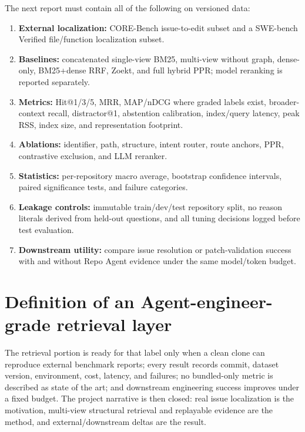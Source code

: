 \documentclass[UTF8,12pt,openany]{ctexbook}
\begin{document}
The next report must contain all of the following on versioned data:\par

\begin{enumerate}
\item \textbf{External localization:} CORE-Bench issue-to-edit subset and a SWE-bench Verified file/function localization subset.
\item \textbf{Baselines:} concatenated single-view BM25, multi-view without graph, dense-only, BM25+dense RRF, Zoekt, and full hybrid PPR; model reranking is reported separately.
\item \textbf{Metrics:} Hit@1/3/5, MRR, MAP/nDCG where graded labels exist, broader-context recall, distractor@1, abstention calibration, index/query latency, peak RSS, index size, and representation footprint.
\item \textbf{Ablations:} identifier, path, structure, intent router, route anchors, PPR, contrastive exclusion, and LLM reranker.
\item \textbf{Statistics:} per-repository macro average, bootstrap confidence intervals, paired significance tests, and failure categories.
\item \textbf{Leakage controls:} immutable train/dev/test repository split, no reason literals derived from held-out questions, and all tuning decisions logged before test evaluation.
\item \textbf{Downstream utility:} compare issue resolution or patch-validation success with and without Repo Agent evidence under the same model/token budget.
\end{enumerate}

\section{Definition of an Agent-engineer-grade retrieval layer}

The retrieval portion is ready for that label only when a clean clone can reproduce external benchmark reports; every result records commit, dataset version, environment, cost, latency, and failures; no bundled-only metric is described as state of the art; and downstream engineering success improves under a fixed budget. The project narrative is then closed: real issue localization is the motivation, multi-view structural retrieval and replayable evidence are the method, and external/downstream deltas are the result.\par


\clearpage
\end{document}
